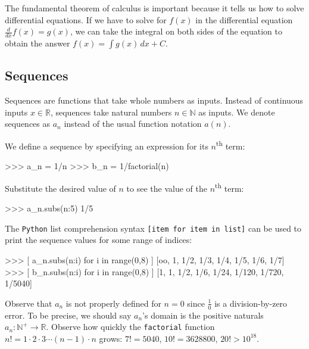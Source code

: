 \noindent
The fundamental theorem of calculus is important because it tells us how to solve differential equations.
If we have to solve for $f(x)$ in the differential equation $\frac{d}{dx}f(x) = g(x)$,
we can take the integral on both sides of the equation to obtain the answer $f(x) = \int g(x)\,dx + C$.

\subsection{Sequences}
\label{calculus:sequences}

Sequences are functions that take whole numbers as inputs.												
Instead of continuous inputs $x\in \mathbb{R}$,
sequences take natural numbers $n\in\mathbb{N}$ as inputs.
We denote sequences as $a_n$ instead of the usual function notation $a(n)$.

We define a sequence by specifying an expression for its $n$\textsuperscript{th} term:



\small
\begin{verbatimtab}
>>> a_n = 1/n
>>> b_n = 1/factorial(n)
\end{verbatimtab}
\normalsize

\noindent
Substitute the desired value of $n$ to see the value of the $n$\textsuperscript{th} term:

\small
\begin{verbatimtab}
>>> a_n.subs({n:5})
1/5
\end{verbatimtab}
\normalsize

\noindent
The \texttt{Python} list comprehension syntax \texttt{[item for item in list]}
can be used to print the sequence values for some range of indices:



\small
\begin{verbatimtab}
>>> [ a_n.subs({n:i}) for i in range(0,8) ]
[oo, 1, 1/2, 1/3, 1/4,  1/5,   1/6,   1/7]  
>>> [ b_n.subs({n:i}) for i in range(0,8) ]
[1,  1, 1/2, 1/6, 1/24, 1/120, 1/720, 1/5040]
\end{verbatimtab}
\normalsize

\noindent
Observe that $a_n$ is not properly defined for $n=0$ since $\frac{1}{0}$ is a division-by-zero error.
To be precise, we should say $a_n$'s domain is the positive naturals $a_n:\mathbb{N}^+ \to \mathbb{R}$.
Observe how quickly the \texttt{factorial} function $n!=1\cdot2\cdot3\cdots(n-1)\cdot n$ grows:
$7!= 5040$, $10!=3628800$, $20! > 10^{18}$.



